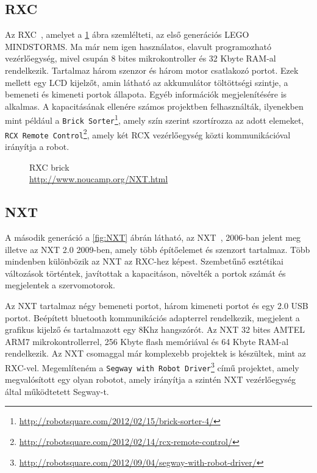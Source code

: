 \subsection{RXC}
Az RXC~\cite{rxcAttribution}, amelyet a \ref{fig:RXC} ábra szemlélteti, az első generációs LEGO MINDSTORMS. Ma már nem igen használatos, elavult programozható vezérlőegység, mivel csupán 8 bites mikrokontroller és 32 Kbyte RAM-al rendelkezik. Tartalmaz három szenzor és három motor csatlakozó portot. Ezek mellett egy LCD kijelzőt, amin látható az akkumulátor töltöttségi szintje, a bemeneti és kimeneti portok állapota. Egyéb információk megjelenítésére is alkalmas. A kapacitásának ellenére számos projektben felhasználták, ilyenekben mint például a \texttt{Brick Sorter}\footnote{\href {http://robotsquare.com/2012/02/15/brick-sorter-4/}{http://robotsquare.com/2012/02/15/brick-sorter-4/}}, amely szín szerint szortírozza az adott elemeket, \texttt{RCX Remote Control}\footnote{\href {http://robotsquare.com/2012/02/14/rcx-remote-control/}{http://robotsquare.com/2012/02/14/rcx-remote-control/}}, amely két RCX vezérlőegység közti kommunikációval irányítja a robot.

\begin{figure}[!htb]
	\centering
	\caption[RXC brick]
	{RXC brick\\
	\href{http://www.noucamp.org/cp1/psol/NXT.html}{http://www.noucamp.org/NXT.html}}
	\label{fig:RXC}
\end{figure}

\subsection{NXT}
A második generáció a \ref{fig:NXT} ábrán látható, az NXT~\cite{nxtAttribution}\cite{nxtVsEv3}, 2006-ban jelent meg illetve az NXT 2.0 2009-ben, amely több építőelemet és szenzort tartalmaz. Több mindenben különbözik az NXT az RXC-hez képest. Szembetűnő esztétikai változások történtek, javítottak a kapacitáson, növelték a portok számát és megjelentek a szervomotorok.

Az NXT tartalmaz négy bemeneti portot, három kimeneti portot és egy 2.0 USB portot. Beépített bluetooth kommunikációs adapterrel rendelkezik, megjelent a grafikus kijelző és tartalmazott egy 8Khz hangszórót. Az NXT 32 bites AMTEL ARM7 mikrokontrollerrel, 256 Kbyte flash memóriával és 64 Kbyte RAM-al rendelkezik. Az NXT csomaggal már komplexebb projektek is készültek, mint az RXC-vel. Megemlíteném a \texttt{Segway with Robot Driver}\footnote{\href {http://robotsquare.com/2012/09/04/segway-with-robot-driver/}{http://robotsquare.com/2012/09/04/segway-with-robot-driver/}} című projektet, amely megvalósított egy olyan robotot, amely irányítja a szintén NXT vezérlőegység által működtetett Segway-t.


